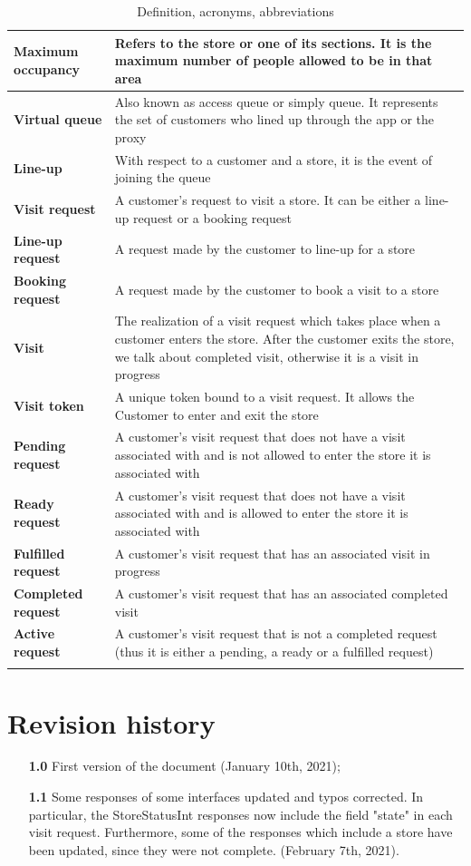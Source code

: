 \documentclass[a4paper,oneside,11pt]{book}
\begin{document}
\begin{longtable}[c] { |>{\bfseries{}}C{0.25\textwidth}|H{0.55\textwidth}| }
        Maximum occupancy & Refers to the store or one of its sections. It is the maximum number of people allowed to be in that area \\ \hline
        Virtual queue & Also known as access queue or simply queue. It represents the set of customers who lined up through the app or the proxy \\ \hline
        Line-up & With respect to a customer and a store, it is the event of joining the queue \\ \hline
        Visit request & A customer’s request to visit a store. It can be either a line-up request or a booking request \\ \hline
        Line-up request & A request made by the customer to line-up for a store \\ \hline
        Booking request & A request made by the customer to book a visit to a store \\ \hline
        Visit & The realization of a visit request which takes place when a customer enters the store. After the customer exits the store, we talk about completed visit, otherwise it is a visit in progress  \\ \hline
        Visit token & A unique token bound to a visit request. It allows the Customer to enter and exit the store \\ \hline
        Pending request & A customer’s visit request that does not have a visit associated with and is not allowed to enter the store it is associated with \\ \hline
        Ready request & A customer’s visit request that does not have a visit associated with and is allowed to enter the store it is associated with \\ \hline
        Fulfilled request & A customer’s visit request that has an associated visit in progress \\ \hline
        Completed request & A customer’s visit request that has an associated completed visit \\ \hline
        Active request & A customer’s visit request that is not a completed request (thus it is either a pending, a ready or a fulfilled request) \\
        \hline
    \caption{Definition, acronyms, abbreviations}
    \label{table:definitions_acronyms_abbreviations}
    \end{longtable}

    \section{Revision history}
    \begin{itemize}
        \item[\textbf{1.0}] First version of the document (January 10th, 2021);
        \item[\textbf{1.1}] Some responses of some interfaces updated and typos corrected. In particular, the StoreStatusInt responses now include the field "state" in each visit request. Furthermore, some of the responses which include a store have been updated, since they were not complete. (February 7th, 2021).
    \end{itemize}
    
\end{document}
